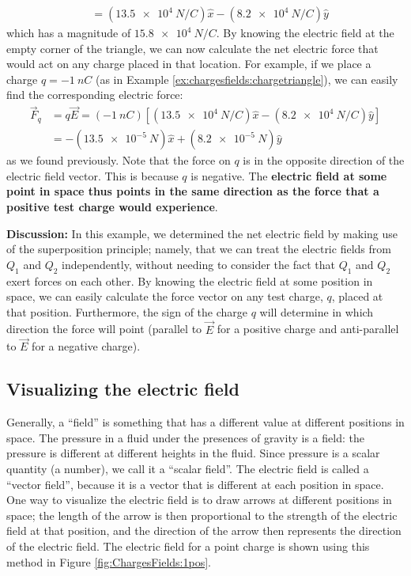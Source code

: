 \begin{example}
\begin{align*}
&=(\SI{13.5e4}{N/C})\hat x-(\SI{8.2e4}{N/C})\hat y
\end{align*}
which has a magnitude of $\SI{15.8e4}{N/C}$. By knowing the electric field at the empty corner of the triangle, we can now calculate the net electric force that would act on any charge placed in that location. For example, if we place a charge $q=\SI{-1}{nC}$ (as in Example \ref{ex:chargesfields:chargetriangle}), we can easily find the corresponding electric force:
\begin{align*}
\vec F_q &= q\vec E=(\SI{-1}{nC})\left[ (\SI{13.5e4}{N/C})\hat x-(\SI{8.2e4}{N/C})\hat y \right]\\
&=-(\SI{13.5e-5}{N})\hat x+(\SI{8.2e-5}{N})\hat y
\end{align*}
as we found previously. Note that the force on $q$ is in the opposite direction of the electric field vector. This is because $q$ is negative. The \textbf{electric field at some point in space thus points in the same direction as the force that a positive test charge would experience}.

\textbf{Discussion:} In this example, we determined the net electric field by making use of the superposition principle; namely, that we can treat the electric fields from $Q_1$ and $Q_2$ independently, without needing to consider the fact that $Q_1$ and $Q_2$ exert forces on each other. By knowing the electric field at some position in space, we can easily calculate the force vector on any test charge, $q$, placed at that position. Furthermore, the sign of the charge $q$ will determine in which direction the force will point (parallel to $\vec E$ for a positive charge and anti-parallel to $\vec E$ for a negative charge).
\end{example}

\subsection{Visualizing the electric field}
Generally, a ``field'' is something that has a different value at different positions in space. The pressure in a fluid under the presences of gravity is a field: the pressure is different at different heights in the fluid. Since pressure is a scalar quantity (a number), we call it a ``scalar field''. The electric field is called a ``vector field'', because it is a vector that is different at each position in space. One way to visualize the electric field is to draw arrows at different positions in space; the length of the arrow is then proportional to the strength of the electric field at that position, and the direction of the arrow then represents the direction of the electric field. The electric field for a point charge is shown using this method in Figure \ref{fig:ChargesFields:1pos}.

